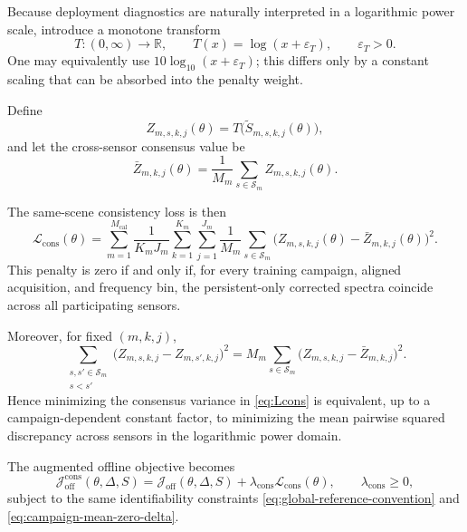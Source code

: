 Because deployment diagnostics are naturally interpreted in a logarithmic
power scale, introduce a monotone transform
\begin{equation}
T:(0,\infty)\to\mathbb R,
\qquad
T(x)=\log(x+\varepsilon_T),
\qquad
\varepsilon_T>0.
\label{eq:consistency-transform}
\end{equation}
One may equivalently use $10\log_{10}(x+\varepsilon_T)$; this differs only by
a constant scaling that can be absorbed into the penalty weight.

Define
\begin{equation}
Z_{m,s,k,j}(\theta)
=
T\!\bigl(\widetilde S_{m,s,k,j}(\theta)\bigr),
\label{eq:consistency-log-spectrum}
\end{equation}
and let the cross-sensor consensus value be
\begin{equation}
\bar Z_{m,k,j}(\theta)
=
\frac{1}{M_m}
\sum_{s\in\mathcal S_m}
Z_{m,s,k,j}(\theta).
\label{eq:consistency-consensus}
\end{equation}

The same-scene consistency loss is then
\begin{equation}
\mathcal L_{\mathrm{cons}}(\theta)
=
\sum_{m=1}^{M_{\mathrm{cal}}}
\frac{1}{K_mJ_m}
\sum_{k=1}^{K_m}
\sum_{j=1}^{J_m}
\frac{1}{M_m}
\sum_{s\in\mathcal S_m}
\bigl(
Z_{m,s,k,j}(\theta)
-
\bar Z_{m,k,j}(\theta)
\bigr)^2.
\label{eq:Lcons}
\end{equation}
This penalty is zero if and only if, for every training campaign, aligned
acquisition, and frequency bin, the persistent-only corrected spectra
coincide across all participating sensors.

Moreover, for fixed $(m,k,j)$,
\begin{equation}
\sum_{\substack{s,s'\in\mathcal S_m\\ s<s'}}
\bigl(
Z_{m,s,k,j}
-
Z_{m,s',k,j}
\bigr)^2
=
M_m
\sum_{s\in\mathcal S_m}
\bigl(
Z_{m,s,k,j}
-
\bar Z_{m,k,j}
\bigr)^2.
\label{eq:consistency-pairwise-identity}
\end{equation}
Hence minimizing the consensus variance in \eqref{eq:Lcons} is equivalent,
up to a campaign-dependent constant factor, to minimizing the mean pairwise
squared discrepancy across sensors in the logarithmic power domain.

The augmented offline objective becomes
\begin{equation}
\mathcal J_{\mathrm{off}}^{\mathrm{cons}}(\theta,\Delta,S)
=
\mathcal J_{\mathrm{off}}(\theta,\Delta,S)
+
\lambda_{\mathrm{cons}}
\mathcal L_{\mathrm{cons}}(\theta),
\qquad
\lambda_{\mathrm{cons}}\ge 0,
\label{eq:Joff-cons}
\end{equation}
subject to the same identifiability constraints
\eqref{eq:global-reference-convention} and
\eqref{eq:campaign-mean-zero-delta}.

